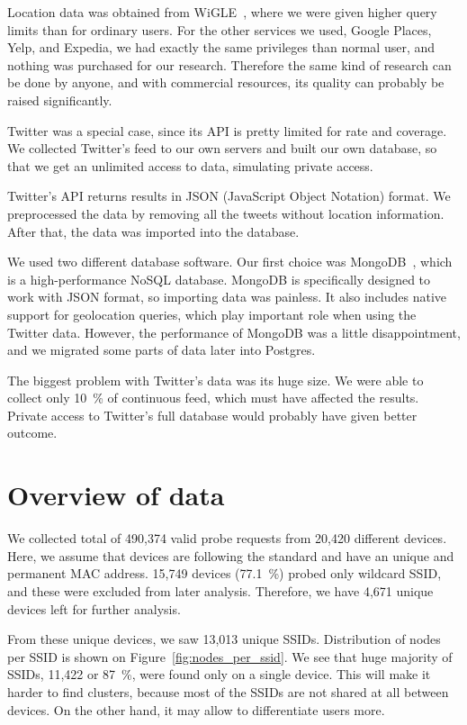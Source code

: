 \documentclass[12pt,a4paper,oneside,pdftex]{report}
\begin{document}
Location data was obtained from WiGLE~\cite{wigle}, where we were given higher query limits than for ordinary users. For the other services we used, Google Places, Yelp, and Expedia, we had exactly the same privileges than normal user, and nothing was purchased for our research. Therefore the same kind of research can be done by anyone, and with commercial resources, its quality can probably be raised significantly.

Twitter was a special case, since its API is pretty limited for rate and coverage. We collected Twitter's feed to our own servers and built our own database, so that we get an unlimited access to data, simulating private access. 

Twitter's API returns results in JSON (JavaScript Object Notation) format. We preprocessed the data by removing all the tweets without location information. After that, the data was imported into the database.

We used two different database software. Our first choice was MongoDB~\cite{mongodb}, which is a high-performance NoSQL database. MongoDB is specifically designed to work with JSON format, so importing data was painless. It also includes native support for geolocation queries, which play important role when using the Twitter data. However, the performance of MongoDB was a little disappointment, and we migrated some parts of data later into Postgres.

The biggest problem with Twitter's data was its huge size. We were able to collect only 10~\% of continuous feed, which must have affected the results. Private access to Twitter's full database would probably have given better outcome.

\section{Overview of data}
\label{sec:data_overview}

We collected total of 490,374 valid probe requests from 20,420 different devices. Here, we assume that devices are following the standard and have an unique and permanent MAC address. 15,749 devices (77.1~\%) probed only wildcard SSID, and these were excluded from later analysis. Therefore, we have 4,671 unique devices left for further analysis.

From these unique devices, we saw 13,013 unique SSIDs. Distribution of nodes per SSID is shown on Figure~\ref{fig:nodes_per_ssid}. We see that huge majority of SSIDs, 11,422 or 87~\%, were found only on a single device. This will make it harder to find clusters, because most of the SSIDs are not shared at all between devices. On the other hand, it may allow to differentiate users more.
\end{document}
